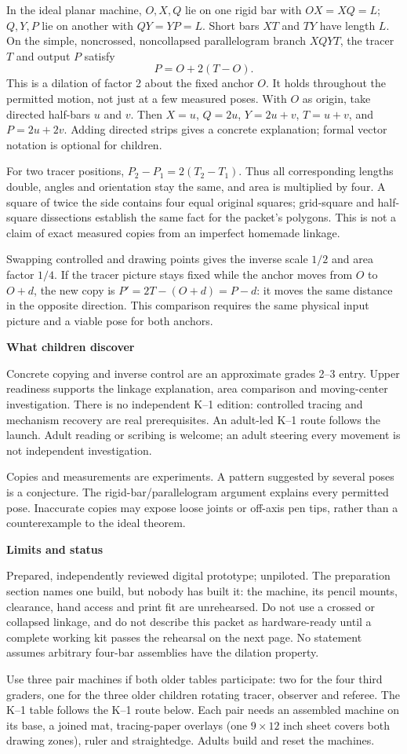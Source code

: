 \documentclass[11pt,letterpaper]{article}
\newcommand{\heading}[1]{\par\vspace{4pt}{\large\bfseries #1}\par}
\newcommand{\sub}[1]{\par\textbf{#1}\par}
\begin{document}
\heading{Mathematical overview}
In the ideal planar machine, $O,X,Q$ lie on one rigid bar with $OX=XQ=L$; $Q,Y,P$ lie on another with $QY=YP=L$. Short bars $XT$ and $TY$ have length $L$. On the simple, noncrossed, noncollapsed parallelogram branch $XQYT$, the tracer $T$ and output $P$ satisfy
\[
 P=O+2(T-O).
\]
This is a dilation of factor 2 about the fixed anchor $O$. It holds throughout the permitted motion, not just at a few measured poses. With $O$ as origin, take directed half-bars $u$ and $v$. Then $X=u$, $Q=2u$, $Y=2u+v$, $T=u+v$, and $P=2u+2v$. Adding directed strips gives a concrete explanation; formal vector notation is optional for children.

For two tracer positions, $P_2-P_1=2(T_2-T_1)$. Thus all corresponding lengths double, angles and orientation stay the same, and area is multiplied by four. A square of twice the side contains four equal original squares; grid-square and half-square dissections establish the same fact for the packet's polygons. This is not a claim of exact measured copies from an imperfect homemade linkage.

Swapping controlled and drawing points gives the inverse scale $1/2$ and area factor $1/4$. If the tracer picture stays fixed while the anchor moves from $O$ to $O+d$, the new copy is $P'=2T-(O+d)=P-d$: it moves the same distance in the opposite direction. This comparison requires the same physical input picture and a viable pose for both anchors.

\sub{What children discover}
Concrete copying and inverse control are an approximate grades 2--3 entry. Upper readiness supports the linkage explanation, area comparison and moving-center investigation. There is no independent K--1 edition: controlled tracing and mechanism recovery are real prerequisites. An adult-led K--1 route follows the launch. Adult reading or scribing is welcome; an adult steering every movement is not independent investigation.

Copies and measurements are experiments. A pattern suggested by several poses is a conjecture. The rigid-bar/parallelogram argument explains every permitted pose. Inaccurate copies may expose loose joints or off-axis pen tips, rather than a counterexample to the ideal theorem.

\sub{Limits and status}
Prepared, independently reviewed digital prototype; unpiloted. The preparation section names one build, but nobody has built it: the machine, its pencil mounts, clearance, hand access and print fit are unrehearsed. Do not use a crossed or collapsed linkage, and do not describe this packet as hardware-ready until a complete working kit passes the rehearsal on the next page. No statement assumes arbitrary four-bar assemblies have the dilation property.
\newpage
\heading{Preparation and the first visit}
Use three pair machines if both older tables participate: two for the four third graders, one for the three older children rotating tracer, observer and referee. The K--1 table follows the K--1 route below. Each pair needs an assembled machine on its base, a joined mat, tracing-paper overlays (one $9\times12$ inch sheet covers both drawing zones), ruler and straightedge. Adults build and reset the machines.
\end{document}

